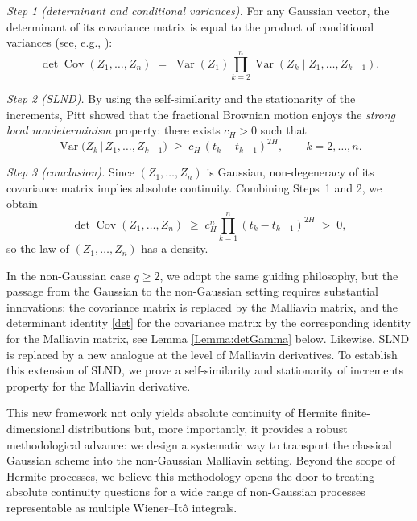 \documentclass[a4paper,10pt]{article}
\theoremstyle{definition}
\theoremstyle{plain}
\newcommand\1{\mathbbm{1}}
\DeclareMathOperator*{\Var}{Var}
\DeclareMathOperator*{\Cov}{Cov}
\begin{document}
\medskip

\emph{Step 1 (determinant and conditional variances).}  
For any Gaussian vector, the determinant of its covariance matrix is equal to the product of conditional variances (see, e.g., \cite[Eq. (2.8) p. 71]{Berman}):
\begin{equation}\label{det}
\det \Cov (Z_1,\dots,Z_n)\;=\;\Var(Z_1)\prod_{k=2}^n \Var(Z_k\mid Z_1,\dots,Z_{k-1}).
\end{equation}

\medskip

\emph{Step 2 (SLND).} 
By using the self-similarity and the stationarity of the increments, Pitt \cite[Lemma 7.1]{Pitt} showed that the fractional Brownian motion enjoys the \emph{strong local nondeterminism} property: there exists $c_H>0$ such that
\begin{equation}\label{eq:SLND-general}
\Var\!\Big(Z_{k}\,\Big|\,Z_{1},\dots,Z_{{k-1}}\Big) \;\ge\; c_H\,(t_k-t_{k-1})^{2H}, \qquad k=2,\dots,n.
\end{equation}

\medskip

\emph{Step 3 (conclusion).}  
Since $(Z_1,\dots,Z_n)$ is Gaussian, non-degeneracy of its covariance matrix implies absolute continuity. 
Combining Steps~1 and 2, we obtain
\[
\det \Cov(Z_1,\dots,Z_n)\;\ge\;c_H^n\prod_{k=1}^n (t_k-t_{k-1})^{2H}\;>\;0,
\]
so the law of $(Z_{1},\dots,Z_{n})$ has a density.

\medskip
 
In the non-Gaussian case $q \ge 2$, we adopt the same guiding philosophy, but the passage from the Gaussian to the non-Gaussian setting requires substantial innovations: the covariance matrix is replaced by the Malliavin matrix, and the determinant identity \eqref{det} for the covariance matrix by the corresponding identity for the Malliavin matrix, see Lemma \ref{Lemma:detGamma} below. Likewise, SLND is replaced by a new analogue at the level of Malliavin derivatives. To establish this extension of SLND, we prove a self-similarity and stationarity of increments property for the Malliavin derivative.
 
 \medskip
 
This new framework not only yields absolute continuity of Hermite finite-dimensional distributions but, more importantly, it provides a robust methodological advance: we design a systematic way to transport the classical Gaussian scheme into the non-Gaussian Malliavin setting. Beyond the scope of Hermite processes, we believe this methodology opens the door to treating absolute continuity questions for a wide range of non-Gaussian processes representable as multiple Wiener–Itô integrals.
 
\end{document}
